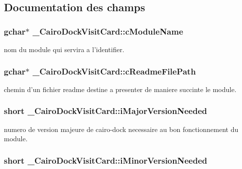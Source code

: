 \subsection{Documentation des champs}
\subsubsection{\setlength{\rightskip}{0pt plus 5cm}gchar$\ast$ {\bf \_\-CairoDockVisitCard::cModuleName}}\label{struct__CairoDockVisitCard_977fd14b591a762065c6deba330a2aea}


nom du module qui servira a l'identifier. 

\subsubsection{\setlength{\rightskip}{0pt plus 5cm}gchar$\ast$ {\bf \_\-CairoDockVisitCard::cReadmeFilePath}}\label{struct__CairoDockVisitCard_259449090259b643ae3304a9195892e3}


chemin d'un fichier readme destine a presenter de maniere succinte le module. 

\subsubsection{\setlength{\rightskip}{0pt plus 5cm}short {\bf \_\-CairoDockVisitCard::iMajorVersionNeeded}}\label{struct__CairoDockVisitCard_2eb94b4a94f50fd73dab9bba5f8cce9f}


numero de version majeure de cairo-dock necessaire au bon fonctionnement du module. 

\subsubsection{\setlength{\rightskip}{0pt plus 5cm}short {\bf \_\-CairoDockVisitCard::iMinorVersionNeeded}}\label{struct__CairoDockVisitCard_67321e0eaba4a436e9b52f291eb0dd8a}


